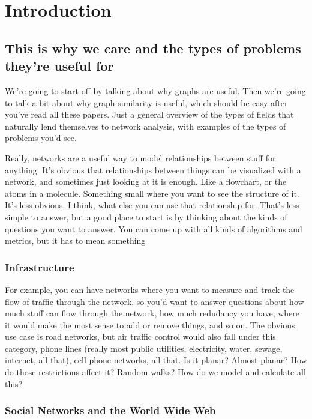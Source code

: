 \documentclass[12pt]{thesis}
\theoremstyle{plain}
\theoremstyle{definition}
\theoremstyle{remark}
\begin{document}
\chapter{Introduction}


\section{This is why we care and the types of problems they're useful for} %


We're going to start off by talking about why graphs are useful. Then we're going to talk a bit about why graph similarity is useful, which should be easy after you've read all these papers. Just a general overview of the types of fields that naturally lend themselves to network analysis, with examples of the types of problems you'd see. 

Really, networks are a useful way to model relationships between stuff for anything. It's obvious that relationships between things can be visualized with a network, and sometimes just looking at it is enough. Like a flowchart, or the atoms in a molecule. Something small where you want to see the structure of it. It's less obvious, I think, what else you can use that relationship for. That's less simple to answer, but a good place to start is by thinking about the kinds of questions you want to answer. You can come up with all kinds of algorithms and metrics, but it has to mean something


\subsection{Infrastructure}


For example, you can have networks where you want to measure and track the flow of traffic through the network, so you'd want to answer questions about how much stuff can flow through the network, how much redudancy you have, where it would make the most sense to add or remove things, and so on. The obvious use case is road networks, but air traffic control would also fall under this category, phone lines (really most public utilities, electricity, water, sewage, internet, all that), cell phone networks, all that. Is it planar? Almost planar? How do those restrictions affect it? Random walks? How do we model and calculate all this?


\subsection{Social Networks and the World Wide Web}
\end{document}
